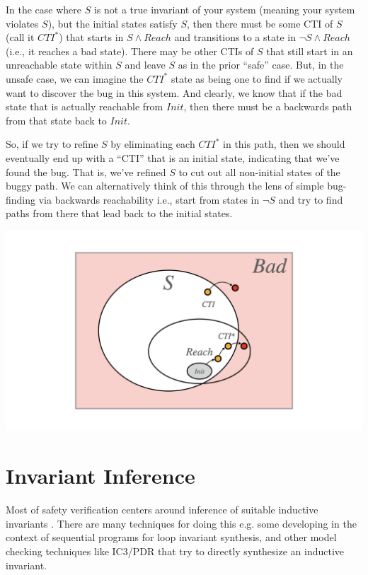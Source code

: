 \documentclass[10pt,a4paper]{article}
\begin{document}
In the case where $S$ is not a true invariant of your system (meaning your system violates $S$), but the initial states satisfy $S$, then there must be some CTI of $S$ (call it $CTI^*$) that starts in $S \wedge Reach$ and transitions to a state in $\neg S \wedge Reach$ (i.e., it reaches a bad state). There may be other CTIs of $S$ that still start in an unreachable state within $S$ and leave $S$ as in the prior ``safe'' case. But, in the unsafe case, we can imagine the $CTI^*$ state as being one to find if we actually want to discover the bug in this system. And clearly, we know that if the bad state that is actually reachable from $Init$, then there must be a backwards path from that state back to $Init$. 

So, if we try to refine $S$ by eliminating each $CTI^*$ in this path, then we should eventually end up with a ``CTI'' that is an initial state, indicating that we've found the bug. That is, we've refined $S$ to cut out all non-initial states of the buggy path. We can alternatively think of this through the lens of simple bug-finding via backwards reachability i.e., start from states in $\neg S$ and try to find paths from there that lead back to the initial states.

\begin{center}
    \includegraphics[scale=0.15]{diagrams/inductive_inv1/inductive_inv1.002.png}
\end{center}

\section{Invariant Inference}

Most of safety verification centers around inference of suitable inductive invariants \cite{mannasafetybook}. There are many techniques for doing this e.g. some developing in the context of sequential programs for loop invariant synthesis, and other model checking techniques like IC3/PDR \cite{bradley2011sat} that try to directly synthesize an inductive invariant.
\end{document}
